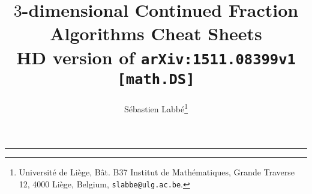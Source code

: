 \documentclass[10pt,landscape,a4paper]{article}
\begin{document}
\title{$3$-dimensional Continued Fraction Algorithms Cheat Sheets\\
HD version of \texttt{arXiv:1511.08399v1 [math.DS]}}
\author{Sébastien Labbé\footnote{
Université de Liège,
B\^at. B37 Institut de Math\'ematiques,
Grande Traverse 12,
4000 Li\`ege,
Belgium,
\texttt{slabbe@ulg.ac.be}.}}
\date{}

\maketitle



\thispagestyle{empty} %


\begin{multicols}{2}

\columnbreak
\tableofcontents
\end{multicols}

\raggedright

\newpage

\begin{multicols}{3}
\setlength{\premulticols}{1pt}
\setlength{\postmulticols}{1pt}
\setlength{\multicolsep}{1pt}
\setlength{\columnsep}{2pt}
\newcommand{\note}[1]{\hfill\textrm{\textcolor{gray}{#1}}}
\newcommand{\args}[1]{\textit{\textcolor{blue}{#1}}}
\newcommand{\stdout}[1]{\textcolor{Sepia}{#1}}
\footnotesize


\end{multicols}

\footnotesize


\begin{multicols}{3}
\setlength{\premulticols}{1pt}
\setlength{\postmulticols}{1pt}
\setlength{\multicolsep}{1pt}
\setlength{\columnsep}{2pt}
\newcommand{\note}[1]{\hfill\textrm{\textcolor{gray}{#1}}}
\newcommand{\args}[1]{\textit{\textcolor{blue}{#1}}}
\newcommand{\stdout}[1]{\textcolor{Sepia}{#1}}
\raggedright
\footnotesize




\rule{0.3\linewidth}{0.25pt}
\scriptsize



\end{multicols}
\end{document}
